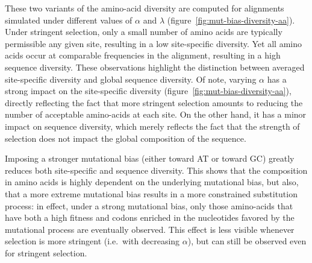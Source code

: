 These two variants of the amino-acid diversity are computed for alignments simulated under different values of $\alpha$ and $\lambda$ (figure~\ref{fig:mut-bias-diversity-aa}).
Under stringent selection, only a small number of amino acids are typically permissible any given site, resulting in a low site-specific diversity.
Yet all amino acids occur at comparable frequencies in the alignment, resulting in a high sequence diversity.
These observations highlight the distinction between averaged site-specific diversity and global sequence diversity.
Of note, varying $\alpha$ has a strong impact on the site-specific diversity (figure~\ref{fig:mut-bias-diversity-aa}), directly reflecting the fact that more stringent selection amounts to reducing the number of acceptable amino-acids at each site.
On the other hand, it has a minor impact on sequence diversity, which merely reflects the fact that the strength of selection does not impact the global composition of the sequence.

Imposing a stronger mutational bias (either toward AT or toward GC) greatly reduces both site-specific and sequence diversity.
This shows that the composition in amino acids is highly dependent on the underlying mutational bias, but also, that a more extreme mutational bias results in a more constrained substitution process: in effect, under a strong mutational bias, only those amino-acids that have both a high fitness and codons enriched in the nucleotides favored by the mutational process are eventually observed.
This effect is less visible whenever selection is more stringent (i.e.~with decreasing $\alpha$), but can still be observed even for stringent selection.

